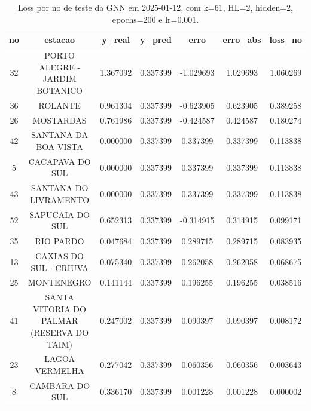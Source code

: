 \begin{table}[h]
\centering
\caption{Loss por no de teste da GNN em 2025-01-12, com k=61, HL=2, hidden=2, epochs=200 e lr=0.001.}
\label{tab:gnn_loss_k61_hl2_h2_e200_d20250112}
\begin{tabular}{ccccccc}
\toprule
no & estacao & y\_real & y\_pred & erro & erro\_abs & loss\_no \\
\midrule
32 & PORTO ALEGRE - JARDIM BOTANICO & 1.367092 & 0.337399 & -1.029693 & 1.029693 & 1.060269 \\
36 & ROLANTE & 0.961304 & 0.337399 & -0.623905 & 0.623905 & 0.389258 \\
26 & MOSTARDAS & 0.761986 & 0.337399 & -0.424587 & 0.424587 & 0.180274 \\
42 & SANTANA DA BOA VISTA & 0.000000 & 0.337399 & 0.337399 & 0.337399 & 0.113838 \\
5 & CACAPAVA DO SUL & 0.000000 & 0.337399 & 0.337399 & 0.337399 & 0.113838 \\
43 & SANTANA DO LIVRAMENTO & 0.000000 & 0.337399 & 0.337399 & 0.337399 & 0.113838 \\
52 & SAPUCAIA DO SUL & 0.652313 & 0.337399 & -0.314915 & 0.314915 & 0.099171 \\
35 & RIO PARDO & 0.047684 & 0.337399 & 0.289715 & 0.289715 & 0.083935 \\
13 & CAXIAS DO SUL - CRIUVA & 0.075340 & 0.337399 & 0.262058 & 0.262058 & 0.068675 \\
25 & MONTENEGRO & 0.141144 & 0.337399 & 0.196255 & 0.196255 & 0.038516 \\
41 & SANTA VITORIA DO PALMAR (RESERVA DO TAIM) & 0.247002 & 0.337399 & 0.090397 & 0.090397 & 0.008172 \\
23 & LAGOA VERMELHA & 0.277042 & 0.337399 & 0.060356 & 0.060356 & 0.003643 \\
8 & CAMBARA DO SUL & 0.336170 & 0.337399 & 0.001228 & 0.001228 & 0.000002 \\
\bottomrule
\end{tabular}
\end{table}
